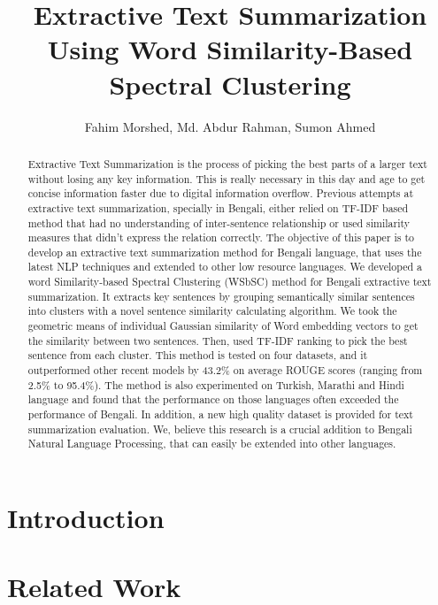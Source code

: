 \documentclass[11pt]{article}
\title{Extractive Text Summarization Using Word Similarity-Based Spectral Clustering}
\author{Fahim Morshed, Md. Abdur Rahman, Sumon Ahmed}
\begin{document}
    \maketitle
    \setlength{\parindent}{0pt}
    \begin{abstract} 
        Extractive Text Summarization is the process of picking the best parts of a  larger text without losing any key information. This is really necessary in this day and age to get concise information faster due to digital information overflow. Previous attempts at extractive text summarization, specially in Bengali,  either relied on TF-IDF based  method that had no understanding of inter-sentence relationship or used similarity  measures that didn't express the relation correctly. The objective of this paper is to develop an extractive text summarization method  for Bengali language, that uses the latest NLP techniques and extended to other low resource languages. We developed a word Similarity-based Spectral Clustering (WSbSC) method for  Bengali extractive text summarization. It extracts key sentences by grouping semantically similar sentences into clusters  with a novel sentence similarity calculating algorithm. We took the geometric means of individual Gaussian similarity of Word embedding  vectors to get the similarity between two sentences. Then, used TF-IDF ranking to pick the best sentence from each cluster. This method is tested on four datasets, and it outperformed other recent models by 43.2\% on average ROUGE scores (ranging from 2.5\% to 95.4\%). The method is also experimented on Turkish, Marathi and Hindi language and found that the performance on those languages often exceeded the performance of Bengali. In addition, a new high quality dataset is provided for text summarization evaluation. We, believe this research is a crucial addition to Bengali Natural Language Processing, that can easily be extended into other languages.
    \end{abstract}

    \section{Introduction}\label{sec:introduction}
    

    \section{Related Work}\label{sec:literature-review}
    
\end{document}
